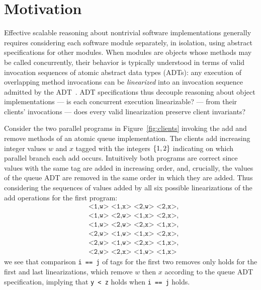 \section{Motivation}
\label{sec:motivation}

Effective scalable reasoning about nontrivial software implementations generally
requires considering each software module separately, in isolation, using
abstract specifications for other modules. When modules are objects whose
methods may be called concurrently, their behavior is typically understood in
terms of valid invocation sequences of atomic abstract data types (ADTs): any
execution of overlapping method invocations can be \emph{linearized} into an
invocation sequence admitted by the ADT~\cite{journals/toplas/HerlihyW90}. ADT
specifications thus decouple reasoning about object implementations — is each
concurrent execution linearizable? — from their clients’ invocations — does
every valid linearization preserve client invariants?

Consider the two parallel programs in Figure~\ref{fig:clients} invoking the add
and remove methods of an atomic queue implementation. The clients add increasing
integer values $w$ and $x$ tagged with the integers ${\{{1,2}\}}$ indicating on
which parallel branch each add occurs. Intuitively both programs are correct
since values with the same tag are added in increasing order, and, crucially,
the values of the queue ADT are removed in the same order in which they are
added. Thus considering the sequences of values added by all six possible
linearizations of the add operations for the first program:
\begin{align*}
  & \texttt{<1,w> <1,x> <2,w> <2,x>}, \\
  & \texttt{<1,w> <2,w> <1,x> <2,x>}, \\
  & \texttt{<1,w> <2,w> <2,x> <1,x>}, \\
  & \texttt{<2,w> <1,w> <1,x> <2,x>}, \\
  & \texttt{<2,w> <1,w> <2,x> <1,x>}, \\
  & \texttt{<2,w> <2,x> <1,w> <1,x>}
\end{align*}
we see that comparison {\tt i == j} of tags for the first two removes only holds
for the first and last linearizations, which remove $w$ then $x$ according to
the queue ADT specification, implying that {\tt y < z} holds when {\tt i == j}
holds.

